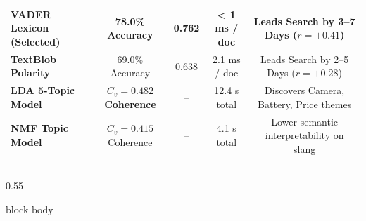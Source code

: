 \documentclass[aspectratio=169, 10pt]{beamer}
\newenvironment{card}[1][]{%
        \begin{beamercolorbox}[rounded=true,shadow=false,wd=\linewidth,sep=3.5pt,#1]{block body}%
        \fontsize{7.8pt}{9.8pt}\selectfont%
    }{%
        \end{beamercolorbox}%
    }
\begin{document}
\begin{frame}[t]
\begin{table}[h]
\begin{tabular}{lcccc}
                \textbf{VADER Lexicon (Selected)} & \textbf{78.0\% Accuracy} & \textbf{0.762} & \textbf{< 1 ms / doc} & \textbf{Leads Search by 3--7 Days ($r=+0.41$)} \\                              
                \textbf{TextBlob Polarity} & 69.0\% Accuracy & 0.638 & 2.1 ms / doc & Leads Search by 2--5 Days ($r=+0.28$) \\                                                                         
                \textbf{LDA 5-Topic Model} & \textbf{$C_v = 0.482$ Coherence} & -- & 12.4 s total & Discovers Camera, Battery, Price themes \\                                                         
                \textbf{NMF Topic Model} & $C_v = 0.415$ Coherence & -- & 4.1 s total & Lower semantic interpretability on slang \\                                                                    
                \bottomrule                                                                                                                                                                            
            \end{tabular}                                                                                                                                                                              
        \end{table}                                                                                                                                                                                    
        \vspace{-0.15cm}                                                                                                                                                                               
        \begin{columns}[T]                                                                                                                                                                             
            \begin{column}{0.55\textwidth}                                                                                                                                                             
                \begin{card}                                                                                                                                                                           

\end{card}
\end{column}
\end{columns}
\end{frame}
\end{document}
